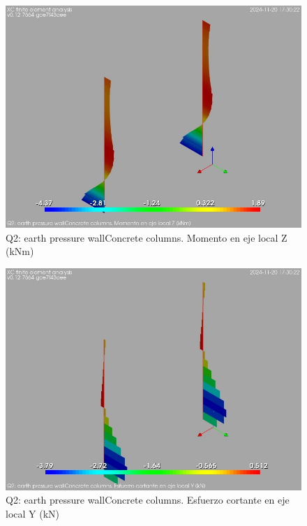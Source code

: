 \begin{figure}[ht]
\begin{center}
\includegraphics[width=\linewidth]{results/graphics/resSimplLC/QearthPressWallcolumnZconcrMz.png}
\caption{Q2: earth pressure wallConcrete columns. Momento en eje local Z (kNm)}
\label{QearthPressWallcolumnZconcrMz}
\end{center}
\end{figure}
\begin{figure}[ht]
\begin{center}
\includegraphics[width=\linewidth]{results/graphics/resSimplLC/QearthPressWallcolumnZconcrVy.png}
\caption{Q2: earth pressure wallConcrete columns. Esfuerzo cortante en eje local Y (kN)}
\label{QearthPressWallcolumnZconcrVy}
\end{center}
\end{figure}
